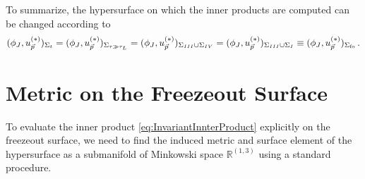 To summarize, the hypersurface on which the inner products are computed can be changed according to
\begin{equation}
    (\phi_J,u_{\vec{p}}^{(*)})_{\Sigma_t}=(\phi_J,u_{\vec{p}}^{(*)})_{\Sigma_{\tau\gg\tau_L}}=(\phi_J,u_{\vec{p}}^{(*)})_{\Sigma_{\rom{3}}\cup\Sigma_{\rom{4}}}=(\phi_J,u_{\vec{p}}^{(*)})_{\Sigma_{\rom{3}}\cup\Sigma_{\rom{1}}}\equiv(\phi_J,u_{\vec{p}}^{(*)})_{\Sigma_{\text{fo}}}\,.
    \label{eq:InnerproductHypersurfaceDeformation}
\end{equation}

\section{Metric on the Freezeout Surface}

To evaluate the inner product \eqref{eq:InvariantInnterProduct} explicitly on the freezeout surface, we need to find the induced metric and surface element of the hypersurface as a submanifold of Minkowski space $\mathbb{R}^{(1,3)}$ using a standard procedure.

